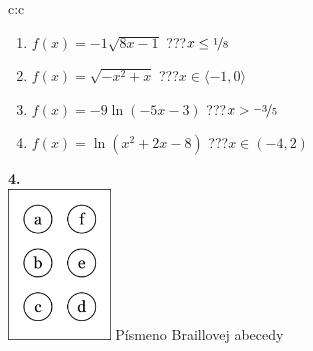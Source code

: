 \documentclass[10pt]{report}
\begin{document}
\begin{tabular}{c:c}
\begin{minipage}[c][99mm][t]{0.49\linewidth}
\begin{center}
\begin{minipage}{0.77\linewidth}
\begin{center}
\begin{varwidth}{\textwidth}
\begin{enumerate}
\item $f(x)=-1\sqrt{8x-1}$\quad \dotfill\; ???\;\dotfill \quad $x\leq\nicefrac{1}{8}$
\item $f(x)=\sqrt{-x^2+x}$\quad \dotfill\; ???\;\dotfill \quad $x\in\langle-1 , 0\rangle$
\item $f(x)=-9\ln{(-5x-3)}$\quad \dotfill\; ???\;\dotfill \quad $x>\nicefrac{-3}{5}$
\item $f(x)=\ln{(x^2+2x-8)}$\quad \dotfill\; ???\;\dotfill \quad $x\in(-4 , 2)$
\end{enumerate}
\end{varwidth}
\end{center}
\end{minipage}
\begin{minipage}{0.20\linewidth}
\begin{center}
{\Huge\bfseries 4.} \\[2mm]
\includegraphics[height=40mm]{../images/braille.png}
{\small Písmeno Braillovej abecedy}
\end{center}
\end{minipage}
\end{center}
\end{minipage}
%
\end{tabular}
\newpage
\thispagestyle{empty}
\end{document}
